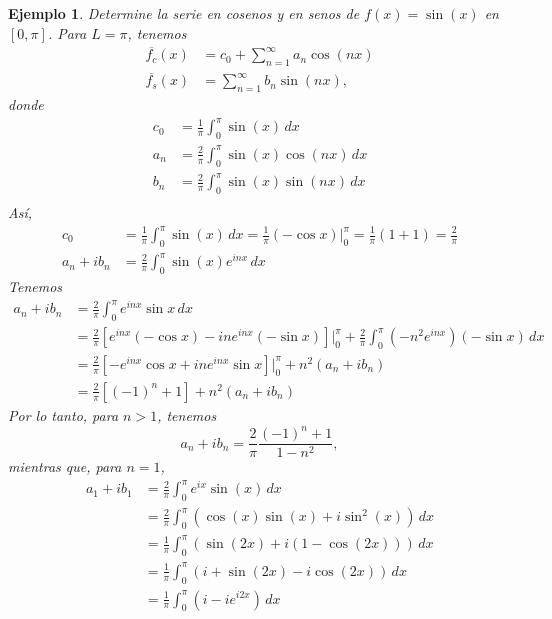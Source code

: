 \documentclass[11pt,letterpaper,draft]{report}
\newtheorem{example}[defn]{Ejemplo}
\newcommand\<{\langle}
\renewcommand\>{\rangle}
\begin{document}
\begin{example}
  Determine la serie en cosenos y en senos de $f(x)=\sin(x)$ en
  $[0,\pi]$.
  Para $L=\pi$, tenemos
  \begin{align*}
    \overline{f_c}(x)
    &=
    c_0
    +
    \sum_{n=1}^{\infty}a_n\cos(nx) \\
    \overline{f_s}(x)
    &= \sum_{n=1}^{\infty}b_n\sin(nx),
  \end{align*}
  donde
  \begin{align*}
    c_0
    &= \frac{1}{\pi}\int_{0}^{\pi}\sin(x)\,dx \\
    a_n
    &= \frac{2}{\pi}\int_{0}^{\pi}\sin(x)\cos(n x)\,dx \\
    b_n
    &= \frac{2}{\pi}\int_{0}^{\pi}\sin(x)\sin(n x)\,dx \\
  \end{align*}
  Así,
  \begin{align*}
    c_0
    &=
    \frac{1}{\pi}\int_{0}^{\pi}\sin(x)\,dx
    =\frac{1}{\pi}(-\cos x)\Big|_{0}^{\pi}
    =\frac{1}{\pi}(1+1)
    =\frac{2}{\pi} \\
    a_n+ib_n
    &= \frac{2}{\pi}\int_{0}^{\pi}\sin(x)e^{inx}\,dx
  \end{align*}
  Tenemos
  \begin{align*}
    a_n+ib_n
    &= \frac{2}{\pi}\int_{0}^{\pi}e^{inx}\sin x \,dx \\
    &= \frac{2}{\pi} \left[
      e^{inx}(-\cos x)
      -ine^{inx}(-\sin x)
    \right]\Big|_{0}^{\pi}
    +\frac{2}{\pi}\int_{0}^{\pi}(-n^{2}e^{inx})(-\sin x)\,dx \\
    &= \frac{2}{\pi} \left[
      -e^{inx}\cos x
      +ine^{inx}\sin x
    \right]\Big|_{0}^{\pi}
    +n^{2}(a_n+ib_n) \\
    &= \frac{2}{\pi} \left[
      (-1)^{n}
      +1
    \right]
    +n^{2}(a_n+ib_n)
  \end{align*}
  Por lo tanto, para $n>1$, tenemos
  \[
    a_n+ib_n
    =
    \frac{2}{\pi}\frac{(-1)^{n}+1}{1-n^{2}}
  ,\]
  mientras que, para $n=1$,
  \begin{align*}
    a_1+ib_1
    &=\frac{2}{\pi}\int_{0}^{\pi}e^{ix}\sin(x)\,dx \\
    &=\frac{2}{\pi}\int_{0}^{\pi}(\cos(x)\sin(x)+i\sin^{2}(x))\,dx \\
    &=\frac{1}{\pi}\int_{0}^{\pi}(\sin(2x)+i(1-\cos(2x)))\,dx \\
    &=\frac{1}{\pi}\int_{0}^{\pi}(i+\sin(2x)-i\cos(2x))\,dx \\
    &=\frac{1}{\pi}\int_{0}^{\pi}(i-ie^{i2x})\,dx \\

\end{align*}
\end{example}
\end{document}
